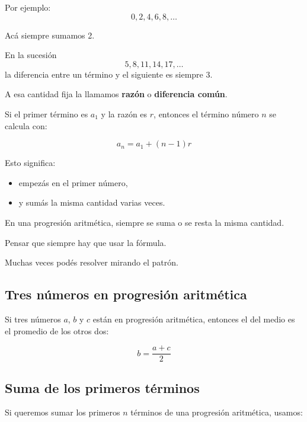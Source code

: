 \documentclass[12pt]{article}
\newcommand{\observa}[1]{%
    \begin{tcolorbox}[colback=amarilloSuave, colframe=naranjaEureka, title=Observa y piensa]
    #1
    \end{tcolorbox}
}
\begin{document}
        Por ejemplo:
        \[
        0,2,4,6,8,\dots
        \]

        Acá siempre sumamos 2.

        \begin{ejemplo}
            En la sucesión
            \[
            5,8,11,14,17,\dots
            \]
            la diferencia entre un término y el siguiente es siempre 3.
        \end{ejemplo}

        A esa cantidad fija la llamamos \textbf{razón} o \textbf{diferencia común}.

        Si el primer término es \(a_1\) y la razón es \(r\), entonces el término número \(n\) se calcula con:

        \[
        a_n=a_1+(n-1)r
        \]

        \observa{Esto significa:
        \begin{itemize}
        \item empezás en el primer número,
        \item y sumás la misma cantidad varias veces.
        \end{itemize}}

        \begin{idea}
            En una progresión aritmética, siempre se suma o se resta la misma cantidad.
        \end{idea}

        \begin{error}
            Pensar que siempre hay que usar la fórmula.

            Muchas veces podés resolver mirando el patrón.
        \end{error}

        \subsection{Tres números en progresión aritmética}
            Si tres números \(a\), \(b\) y \(c\) están en progresión aritmética, entonces el del medio es el promedio de los otros dos:

            \[
            b=\frac{a+c}{2}
            \]

        \subsection{Suma de los primeros términos}
            Si queremos sumar los primeros \(n\) términos de una progresión aritmética, usamos:
\end{document}
